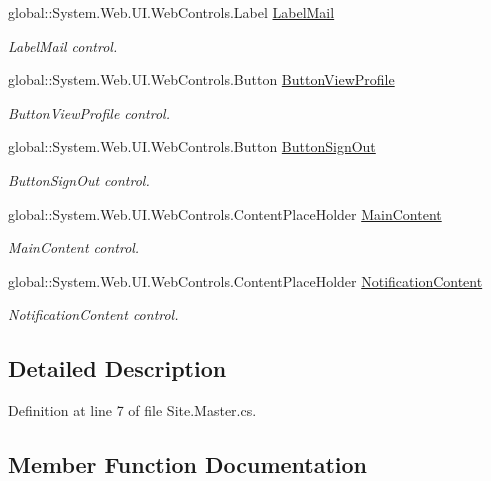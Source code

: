\begin{DoxyCompactItemize}
global\+::\+System.\+Web.\+U\+I.\+Web\+Controls.\+Label \mbox{\hyperlink{classWebApplication_1_1SiteMaster_a594c1bf520b5ada76310e50df143e91b}{Label\+Mail}}
\begin{DoxyCompactList}\small\item\em Label\+Mail control. \end{DoxyCompactList}\item 
global\+::\+System.\+Web.\+U\+I.\+Web\+Controls.\+Button \mbox{\hyperlink{classWebApplication_1_1SiteMaster_a0977d0b502832c397e8672dead732892}{Button\+View\+Profile}}
\begin{DoxyCompactList}\small\item\em Button\+View\+Profile control. \end{DoxyCompactList}\item 
global\+::\+System.\+Web.\+U\+I.\+Web\+Controls.\+Button \mbox{\hyperlink{classWebApplication_1_1SiteMaster_aca81d110c413a44742be7fcd2c464cdc}{Button\+Sign\+Out}}
\begin{DoxyCompactList}\small\item\em Button\+Sign\+Out control. \end{DoxyCompactList}\item 
global\+::\+System.\+Web.\+U\+I.\+Web\+Controls.\+Content\+Place\+Holder \mbox{\hyperlink{classWebApplication_1_1SiteMaster_a8fdc1b5ff8c354ce9d5776cf0c5087a2}{Main\+Content}}
\begin{DoxyCompactList}\small\item\em Main\+Content control. \end{DoxyCompactList}\item 
global\+::\+System.\+Web.\+U\+I.\+Web\+Controls.\+Content\+Place\+Holder \mbox{\hyperlink{classWebApplication_1_1SiteMaster_ac0d3975658a8839098c53e1f37c8f1a5}{Notification\+Content}}
\begin{DoxyCompactList}\small\item\em Notification\+Content control. \end{DoxyCompactList}\end{DoxyCompactItemize}


\subsection{Detailed Description}


Definition at line 7 of file Site.\+Master.\+cs.



\subsection{Member Function Documentation}
\mbox{\label{classWebApplication_1_1SiteMaster_ab90867bea59adb9502f18812b0e2f531}} 
